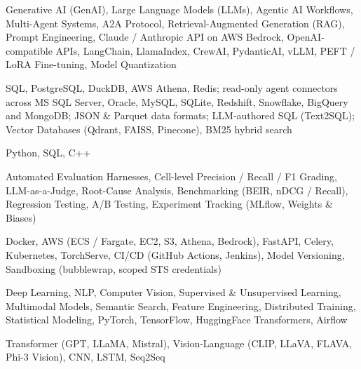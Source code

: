 \documentclass[letter,10pt]{article}
\begin{document}
 Generative AI (GenAI), Large Language Models (LLMs), Agentic AI Workflows, Multi-Agent Systems, A2A Protocol, Retrieval-Augmented Generation (RAG), Prompt Engineering, Claude / Anthropic API on AWS Bedrock, OpenAI-compatible APIs, LangChain, LlamaIndex, CrewAI, PydanticAI, vLLM, PEFT / LoRA Fine-tuning, Model Quantization\par\vspace{2pt}

 SQL, PostgreSQL, DuckDB, AWS Athena, Redis; read-only agent connectors across MS SQL Server, Oracle, MySQL, SQLite, Redshift, Snowflake, BigQuery and MongoDB; JSON \& Parquet data formats; LLM-authored SQL (Text2SQL); Vector Databases (Qdrant, FAISS, Pinecone), BM25 hybrid search\par\vspace{2pt}

 Python, SQL, C++\par\vspace{2pt}

 Automated Evaluation Harnesses, Cell-level Precision / Recall / F1 Grading, LLM-as-a-Judge, Root-Cause Analysis, Benchmarking (BEIR, nDCG / Recall), Regression Testing, A/B Testing, Experiment Tracking (MLflow, Weights \& Biases)\par\vspace{2pt}

 Docker, AWS (ECS / Fargate, EC2, S3, Athena, Bedrock), FastAPI, Celery, Kubernetes, TorchServe, CI/CD (GitHub Actions, Jenkins), Model Versioning, Sandboxing (bubblewrap, scoped STS credentials)\par\vspace{2pt}

 Deep Learning, NLP, Computer Vision, Supervised \& Unsupervised Learning, Multimodal Models, Semantic Search, Feature Engineering, Distributed Training, Statistical Modeling, PyTorch, TensorFlow, HuggingFace Transformers, Airflow\par\vspace{2pt}

 Transformer (GPT, LLaMA, Mistral), Vision-Language (CLIP, LLaVA, FLAVA, Phi-3 Vision), CNN, LSTM, Seq2Seq
\end{document}
